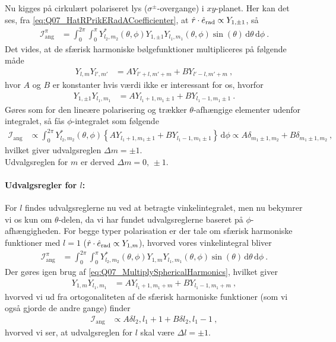 Nu kigges på \textsf{cirkulært polariseret lys} ($\sigma^\pm$-overgange) i $xy$-planet. Her kan det ses, fra \cref{eq:Q07_HatRPrikERadACoefficienter}, at $\Hat{r}\cdot\Hat{e}_\text{rad} \propto Y_{1,\pm 1}$, så
\begin{align}
    \mathcal{I}_\text{ang}^\pi &= \int_0^{2\pi}\int_0^\pi Y_{l_2,m_2}^*(\theta,\phi) Y_{1,\pm 1} Y_{l_1,m_1}(\theta,\phi) \sin(\theta) \, \text{d}\theta \, \text{d}\phi \: .
\end{align}
Det vides, at de sfærisk harmoniske bølgefunktioner multipliceres på følgende måde
\begin{align} \label{eq:Q07_MultiplySphericalHarmonics}
    Y_{l,m}Y_{l',m'} &= A Y_{l'+l,m'+m} + B Y_{l'-l,m'+m} \: ,
\end{align}
hvor $A$ og $B$ er konstanter hvis værdi ikke er interessant for os, hvorfor
\begin{align}
    Y_{1,\pm 1}Y_{l_1,m_1} &= A Y_{l_1 + 1,m_1 \pm 1} + B Y_{l_1-1,m_1\pm 1} \: .
\end{align}
Gøres som for den lineære polarisering og trækker $\theta$-afhængige elementer udenfor integralet, så fås $\phi$-integralet som følgende
\begin{align}
    \mathcal{I}_\text{ang} &\propto \int_0^{2\pi} Y_{l_2,m_2}^*(\theta,\phi) \left\{A Y_{l_1 + 1,m_1 \pm 1} + B Y_{l_1-1,m_1\pm 1}\right\} \, \text{d}\phi \propto A\delta_{m_1\pm1,m_2} + B\delta_{m_1\pm1,m_2} \: ,
\end{align}
hvilket giver udvalgsreglen $\Delta m = \pm 1$.\\

Udvalgsreglen for $m$ er derved $\Delta m = 0,\, \pm 1$.


\paragraph{Udvalgsregler for $l$:} For $l$ findes udvalgsreglerne nu ved at betragte vinkelintegralet, men nu bekymrer vi os kun om $\theta$-delen, da vi har fundet udvalgsreglerne baseret på $\phi$-afhængigheden. For begge typer polarisation er der tale om sfærisk harmoniske funktioner med $l = 1$ ($\Hat{r}\cdot\Hat{e}_\text{rad} \propto Y_{1,m}$), hvorved vores vinkelintegral bliver
\begin{align}
    \mathcal{I}_\text{ang}^\pi &= \int_0^{2\pi}\int_0^\pi Y_{l_2,m_2}^*(\theta,\phi) Y_{1,m} Y_{l_1,m_1}(\theta,\phi) \sin(\theta) \, \text{d}\theta \, \text{d}\phi \: .
\end{align}
Der gøres igen brug af \cref{eq:Q07_MultiplySphericalHarmonics}, hvilket giver
\begin{align}
    Y_{1,m}Y_{l_1,m_1} &= A Y_{l_1 + 1,m_1+m} + B Y_{l_1-1,m_1+m} \: ,
\end{align}
hvorved vi ud fra ortogonaliteten af de sfærisk harmoniske funktioner (som vi også gjorde de andre gange) finder
\begin{align}
    \mathcal{I}_\text{ang} &\propto A \delta{l_2,l_1+1} + B \delta{l_2,l_1-1} \: ,
\end{align}
hvorved vi ser, at udvalgsreglen for $l$ skal være $\Delta l = \pm 1$.


